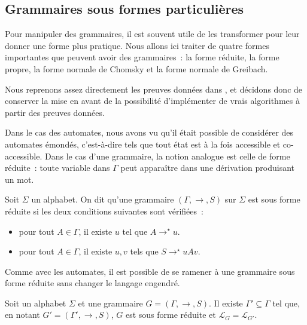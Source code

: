 \subsection{Grammaires sous formes particulières}

Pour manipuler des grammaires, il est souvent utile de les transformer pour leur
donner une forme plus pratique. Nous allons ici traiter de quatre formes
importantes que peuvent avoir des grammaires~: la forme réduite, la forme
propre, la forme normale de Chomsky et la forme normale de Greibach.

Nous reprenons assez directement les preuves données dans
\cite{carton2008langages}, et décidons donc de conserver la mise en avant de la
possibilité d'implémenter de vrais algorithmes à partir des preuves données.

Dans le cas des automates, nous avons vu qu'il était possible de considérer des
automates émondés, c'est-à-dire tels que tout état est à la fois accessible et
co-accessible. Dans le cas d'une grammaire, la notion analogue est celle de
forme réduite~: toute variable dans $\Gamma$ peut apparaître dans une dérivation
produisant un mot.

\begin{definition}
  Soit $\Sigma$ un alphabet. On dit qu'une grammaire $(\Gamma,\to,S)$ sur
  $\Sigma$ est sous forme réduite si les deux conditions suivantes sont
  vérifiées~:
  \begin{itemize}
  \item pour tout $A \in \Gamma$, il existe $u$ tel que $A \to^\star u$.
  \item pour tout $A \in \Gamma$, il existe $u,v$ tels que $S \to^\star uAv$.
  \end{itemize}
\end{definition}

Comme avec les automates, il est possible de se ramener à une grammaire sous
forme réduite sans changer le langage engendré.

\begin{proposition}\label{prop.alg.reduc}
  Soit un alphabet $\Sigma$ et une grammaire $G = (\Gamma,\to,S)$. Il existe
  $\Gamma'\subseteq \Gamma$ tel que, en notant $G' = (\Gamma', \to, S)$,
  $G$ est sous forme réduite et $\mathcal L_G = \mathcal L_{G'}$.
\end{proposition}

